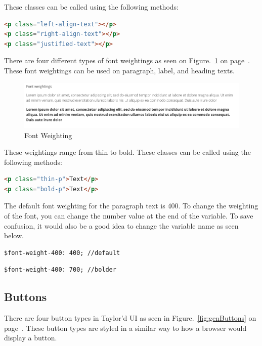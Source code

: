 These classes can be called using the following methods:

 \begin{lstlisting}[language=HTML]
<p class="left-align-text"></p>
<p class="right-align-text"></p>
<p class="justified-text"></p>
\end{lstlisting}

There are four different types of font weightings as seen on Figure.~\ref{fig:fontweight} on  page~\pageref{fig:fontweight}. These font weightings can be used on paragraph, label, and heading texts.

\begin{figure}[h]
\centering
\includegraphics[scale=0.3]{images/font-weighting}
	\caption{Font Weighting}
  	\label{fig:fontweight}
\end{figure}

These weightings range from thin to bold. These classes can be called using the following methods:

\begin{lstlisting}[language=HTML]
<p class="thin-p">Text</p>
<p class="bold-p">Text</p>
\end{lstlisting}

The default font weighting for the paragraph text is 400. To change the weighting of the font, you can change the number value at the end of the variable. To save confusion, it would also be a good idea to change the variable name as seen below.

\begin{lstlisting}[language=HTML]
$font-weight-400: 400; //default
\end{lstlisting}

\begin{lstlisting}[language=HTML]
$font-weight-400: 700; //bolder
\end{lstlisting}

\newpage
\subsection*{Buttons}

There are four button types in Taylor'd UI as seen in Figure.~\ref{fig:genButtons} on  page~\pageref{fig:genButtons}. These button types are styled in a similar way to how a browser would display a button. 

